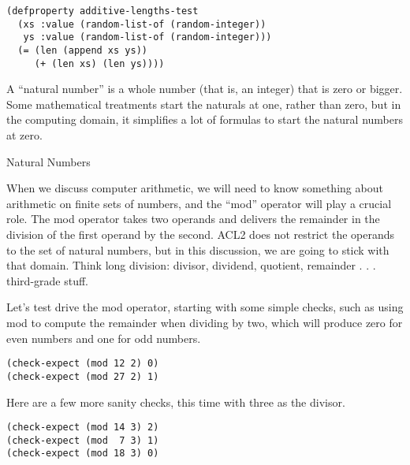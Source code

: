 \label{additive-lengths-test}
\begin{Verbatim}
(defproperty additive-lengths-test
  (xs :value (random-list-of (random-integer))
   ys :value (random-list-of (random-integer)))
  (= (len (append xs ys))
     (+ (len xs) (len ys))))
\end{Verbatim}

\begin{aside}
A ``natural number'' is a whole number (that is, an integer)
that is zero or bigger.
Some mathematical treatments start the naturals at one,
rather than zero, but in the computing domain, 
it simplifies a lot of formulas to start the natural numbers at zero. 
\caption{Natural Numbers}
\label{natural-number-def}
\end{aside}

When we discuss computer arithmetic, we will need to know something about
arithmetic on finite sets of numbers, and the ``mod'' operator will play a crucial role.
\label{mod-function}
The mod operator takes two operands and
delivers the remainder in the division of the first operand by the second.
ACL2 does not restrict the operands to the set of natural numbers,
but in this discussion, we are going to stick with that domain.
Think long division: divisor, dividend, quotient,
remainder . . . third-grade stuff.

Let's test drive the mod operator, starting with
some simple checks, such as using mod 
to compute the remainder when dividing by two,
which will produce zero for even numbers and one for odd numbers.

\begin{Verbatim}
(check-expect (mod 12 2) 0)
(check-expect (mod 27 2) 1)
\end{Verbatim}

Here are a few more sanity checks, this time with three as the divisor.

\begin{Verbatim}
(check-expect (mod 14 3) 2)
(check-expect (mod  7 3) 1)
(check-expect (mod 18 3) 0)
\end{Verbatim}

